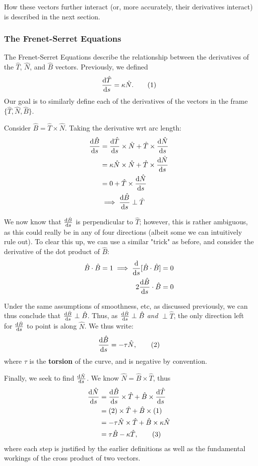 \documentclass[12pt]{article}
\begin{document}
{How these vectors further interact (or, more accurately, their derivatives interact) is described in the next section.

\subsubsection{The Frenet-Serret Equations}

The Frenet-Serret Equations describe the relationship between the derivatives of the $\hat{T}$, $\hat{N}$, and $\hat{B}$ vectors. Previously, we defined \[\frac{\text{d}\hat{T}}{\text{d}s} = \kappa \hat{N}. \qquad (1)\] Our goal is to similarly define each of the derivatives of the vectors in the frame $\{\hat{T}, \hat{N}, \hat{B}\}$.

Consider $\hat{B} = \hat{T} \times \hat{N}$. Taking the derivative wrt arc length: \begin{align*}\frac{\text{d}\hat{B}}{\text{d}s} &= \frac{\text{d}\hat{T}}{\text{d}s} \times \hat{N} + \hat{T} \times \frac{\text{d}\hat{N}}{\text{d}s}\\
    &= \kappa \hat{N} \times \hat{N} + \hat{T} \times \frac{\text{d}\hat{N}}{\text{d}s}\\
    &= 0 + \hat{T} \times \frac{\text{d}\hat{N}}{\text{d}s}\\
    &\implies \frac{\text{d}\hat{B}}{\text{d}s} \perp \hat{T}
\end{align*}

We now know that $\frac{\text{d}\hat{B}}{\text{d}s}$ is perpendicular to $\hat{T}$; however, this is rather ambiguous, as this could really be in any of four directions (albeit some we can intuitively rule out). To clear this up, we can use a similar "trick" as before, and consider the derivative of the dot product of $\hat{B}$: \begin{align*}
    \hat{B} \cdot \hat{B} = 1 \implies \frac{\text{d}}{\text{d}s}[\hat{B} \cdot \hat{B}] &= 0\\
    2 \frac{\text{d}\hat{B}}{\text{d}s}\cdot \hat{B} &= 0\\
\end{align*}

Under the same assumptions of smoothness, etc, as discussed previously, we can thus conclude that $\frac{\text{d}\hat{B}}{\text{d}s} \perp \hat{B}$. Thus, as $\frac{\text{d}\hat{B}}{\text{d}s} \perp \hat{B}$ \textit{and} $\perp \hat{T}$, the only direction left for $\frac{\text{d}\hat{B}}{\text{d}s}$ to point is along $\hat{N}$. We thus write: \[\frac{\text{d}\hat{B}}{\text{d}s} = -\tau \hat{N},\qquad (2)\] where $\tau$ is the \textbf{torsion} of the curve, and is negative by convention.

Finally, we seek to find $\frac{\text{d}\hat{N}}{\text{d}s}$. We know $\hat{N} = \hat{B} \times \hat{T}$, thus \begin{align*}
    \frac{\text{d}\hat{N}}{\text{d}s} &= \frac{\text{d}\hat{B}}{\text{d}s}\times\hat{T} + \hat{B}\times \frac{\text{d}\hat{T}}{\text{d}s}\\
    &= (2) \times \hat{T} + \hat{B} \times (1)\\
    &= -\tau \hat{N} \times \hat{T} + \hat{B} \times \kappa \hat{N}\\
    &= \tau \hat{B} - \kappa \hat{T}, \qquad (3)\\
\end{align*}
where each step is justified by the earlier definitions as well as the fundamental workings of the cross product of two vectors.

}
\end{document}

